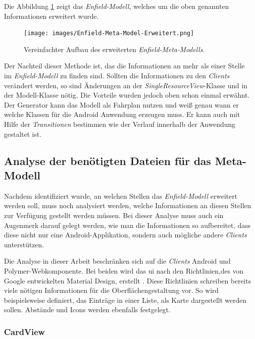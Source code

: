 Die Abbildung \ref{fig:enfield-model-extended} zeigt das \textit{Enfield-Modell}, welches um die oben genannten Informationen erweitert wurde.

\begin{figure}[H]
	\begin{center}
		\texttt{[image: images/Enfield-Meta-Model-Erweitert.png]}
		\caption{Vereinfachter Aufbau des erweiterten \textit{Enfield-Meta-Modells}.}
		\label{fig:enfield-model-extended}
	\end{center}
\end{figure}

Der Nachteil dieser Methode ist, das die Informationen an mehr als einer Stelle im \textit{Enfield-Modell} zu finden sind. Sollten die Informationen zu den \textit{Clients} verändert werden, so sind Änderungen an der \textit{SingleResourceView}-Klasse und in der Modell-Klasse nötig. Die Vorteile wurden jedoch oben schon einmal erwähnt. Der Generator kann das Modell als Fahrplan nutzen und weiß genau wann er welche Klassen für die Android Anwendung erzeugen muss. Er kann auch mit Hilfe der \textit{Transitionen} bestimmen wie der Verlauf innerhalb der Anwendung gestaltet ist.

\newpage
\subsection{Analyse der benötigten Dateien für das Meta-Modell}

Nachdem identifiziert wurde, an welchen Stellen das \textit{Enfield-Modell} erweitert werden soll, muss noch analysiert werden, welche Informationen an diesen Stellen zur Verfügung gestellt werden müssen. Bei dieser Analyse muss auch ein Augenmerk darauf gelegt werden, wie man die Informationen so aufbereitet, dass diese nicht nur eine Android-Applikation, sondern auch mögliche andere \textit{Clients} unterstützen.

Die Analyse in dieser Arbeit beschränken sich auf die \textit{Clients} Android und Polymer-Webkomponente. Bei beiden wird das \acf{ui} nach den Richtlinien,des von Google entwickelten Material Design, erstellt \cite{material}. Diese Richtlinien schreiben bereits viele nötigen Informationen für die Oberflächengestaltung vor. So wird beispielsweise definiert, das Einträge in einer Liste, als Karte dargestellt werden sollen. Abstände und Icons werden ebenfalls festgelegt.

\subsubsection{CardView}

